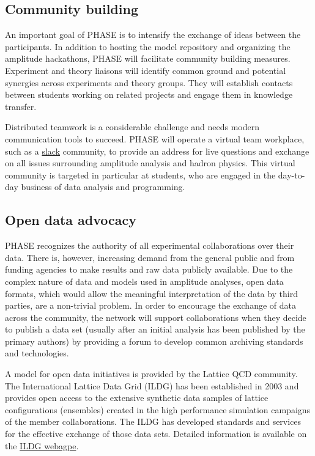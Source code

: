 \subsection{Community building}
\label{sec:community}
An important goal of PHASE is to intensify the exchange of ideas between the participants. In addition to hosting the model repository and organizing the amplitude hackathons, PHASE will facilitate community building measures. Experiment and theory liaisons will identify common ground and potential synergies across experiments and theory groups. They will establish contacts between students working on related projects and engage them in knowledge transfer.

Distributed teamwork is a considerable challenge and needs modern communication tools to succeed. PHASE will operate a virtual team workplace, such as a \href{http://slack.com}{slack} community, to provide an address for live questions and exchange on all issues surrounding amplitude analysis and hadron physics. This virtual community is targeted in particular at students, who are engaged in the day-to-day business of data analysis and programming.

\subsection{Open data advocacy}
\label{sec:opendata}
PHASE recognizes the authority of all experimental collaborations over their data. There is, however, increasing demand from the general public and from funding agencies to make results and raw data publicly available. Due to the complex nature of data and models used in amplitude analyses, open data formats, which would allow the meaningful interpretation of the data by third parties, are a non-trivial problem. In order to encourage the exchange of data across the community, the network will support collaborations when they decide to publish a data set (usually after an initial analysis has been published by the primary authors) by providing a forum to develop common archiving standards and technologies.

A model for open data initiatives is provided by the Lattice QCD community. The International Lattice Data Grid (ILDG) has been established in 2003 \cite{Davies_2003} and provides open access to the extensive synthetic data samples of lattice configurations (ensembles) created in the high performance simulation campaigns of the member collaborations. The ILDG has developed standards and services for the effective exchange of those data sets. Detailed information is available on the \href{http://plone.jldg.org/wiki/index.php/Main_Page}{ILDG webagpe}.

